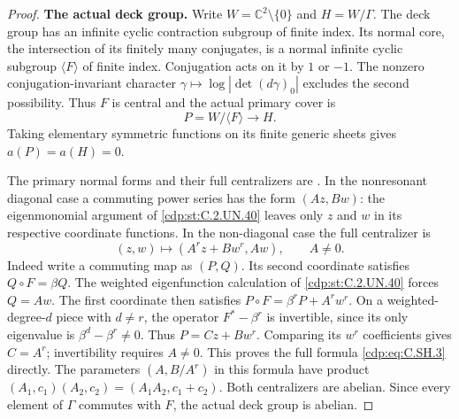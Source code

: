 \begin{proof}
\par\medskip\noindent\textbf{The actual deck group.}
Write $W=\mathbb C^2\setminus\{0\}$ and $H=W/\Gamma$.
The deck group has an infinite cyclic contraction subgroup of
finite index. Its normal core, the intersection of its finitely
many conjugates, is a normal infinite cyclic subgroup
$\langle F\rangle$ of finite index. Conjugation acts on it by
$1$ or $-1$. The nonzero conjugation-invariant character
$\gamma\mapsto\log|\det(d\gamma)_0|$ excludes the second
possibility. Thus $F$ is central and the actual primary cover is
\[
                 P=W/\langle F\rangle\longrightarrow H.
\tag{C.SH.2}\label{cdp:eq:C.SH.2}
\]
Taking elementary symmetric functions on its finite generic
sheets gives $a(P)=a(H)=0$.

The primary normal forms and their full centralizers are
\cite[Theorem~2.1]{Khaled2024Hopf}. In the nonresonant diagonal
case a commuting power series has the form $(Az,Bw)$:
the eigenmonomial argument of \ref{cdp:st:C.2.UN.40} leaves only $z$ and
$w$ in its respective coordinate functions. In the
non-diagonal case the full centralizer is
\[
       (z,w)\longmapsto(A^r z+B w^r,Aw),\qquad A\ne0.
\tag{C.SH.3}\label{cdp:eq:C.SH.3}
\]
Indeed write a commuting map as $(P,Q)$. Its second
coordinate satisfies $Q\circ F=\beta Q$. The weighted
eigenfunction calculation of \ref{cdp:st:C.2.UN.40} forces $Q=Aw$.
The first coordinate then satisfies
$P\circ F=\beta^rP+A^r w^r$. On a weighted-degree-$d$
piece with $d\ne r$, the operator $F^*-\beta^r$ is
invertible, since its only eigenvalue is
$\beta^d-\beta^r\ne0$. Thus $P=Cz+Bw^r$.
Comparing its $w^r$ coefficients gives $C=A^r$;
invertibility requires $A\ne0$. This proves the full
formula \eqref{cdp:eq:C.SH.3} directly.
The parameters $(A,B/A^r)$ in this formula have product
$(A_1,c_1)(A_2,c_2)=(A_1A_2,c_1+c_2)$. Both centralizers
are abelian. Since every element of $\Gamma$ commutes
with $F$, the actual deck group is abelian.


\end{proof}

